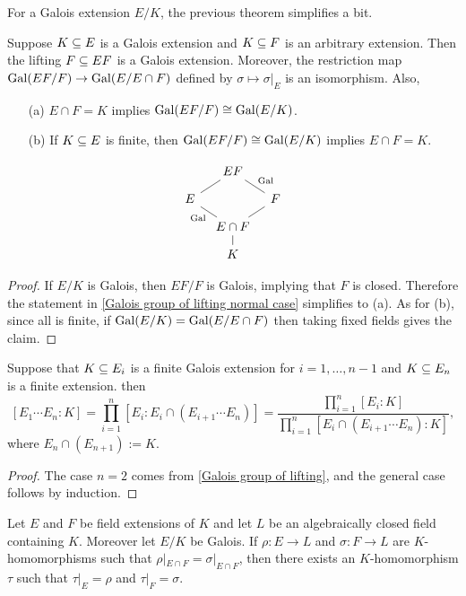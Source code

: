 For a Galois extension $E/K$, the previous theorem simplifies a bit.
\begin{proposition}\label{Galois group of lifting}
Suppose $K\subseteq E$ is a Galois extension and $K\subseteq F$ is an arbitrary extension. Then the lifting $F\subseteq EF$ is a Galois extension. Moreover, the restriction map $\mathrm{Gal}(EF/F)\to\mathrm{Gal}(E/E\cap F)$ defined by $\sigma\mapsto\sigma|_E$ is an isomorphism. Also,
\begin{itemize}
\item[(a)] $E\cap F=K$ implies $\mathrm{Gal}(EF/F)\cong\mathrm{Gal}(E/K)$.
\item[(b)] If $K\subseteq E$ is finite, then $\mathrm{Gal}(EF/F)\cong\mathrm{Gal}(E/K)$ implies $E\cap F=K$.
\end{itemize}
\[\begin{tikzcd}[row sep=8pt,column sep=8pt]
&EF&\\
E\ar[ru,no head]&&F\ar[lu,no head,swap,"\Gal"]\\
&E\cap F\ar[lu,no head,"\Gal"]\ar[ru,no head]&\\
&K\ar[u,no head]&
\end{tikzcd}\]
\end{proposition}
\begin{proof}
If $E/K$ is Galois, then $EF/F$ is Galois, implying that $F$ is closed. Therefore the statement in \cref{Galois group of lifting normal case} simplifies to (a). As for (b), since all is finite, if $\mathrm{Gal}(E/K)=\mathrm{Gal}(E/E\cap F)$ then taking fixed fields gives the claim.
\end{proof}
\begin{corollary}\label{Galois lifting degree}
Suppose that $K\subseteq E_i$ is a finite Galois extension for $i=1,\dots,n-1$ and $K\subseteq E_n$ is a finite extension. then
\[[E_1\cdots E_n:K]=\prod_{i=1}^{n}[E_i:E_i\cap(E_{i+1}\cdots E_n)]=\frac{\prod_{i=1}^{n}[E_i:K]}{\prod_{i=1}^{n}[E_i\cap(E_{i+1}\cdots E_n):K]},\]
where $E_n\cap(E_{n+1}):=K$.
\end{corollary}
\begin{proof}
The case $n=2$ comes from \cref{Galois group of lifting}, and the general case follows by induction.
\end{proof}
\begin{corollary}\label{field embedding to algebraically closed extend if coincide on intersect}
Let $E$ and $F$ be field extensions of $K$ and let $L$ be an algebraically closed field containing $K$. Moreover let $E/K$ be Galois. If $\rho:E\to L$ and $\sigma:F\to L$ are $K$-homomorphisms such that $\rho|_{E\cap F}=\sigma|_{E\cap F}$, then there exists an $K$-homomorphism $\tau$ such that $\tau|_{E}=\rho$ and $\tau|_{F}=\sigma$.
\end{corollary}
